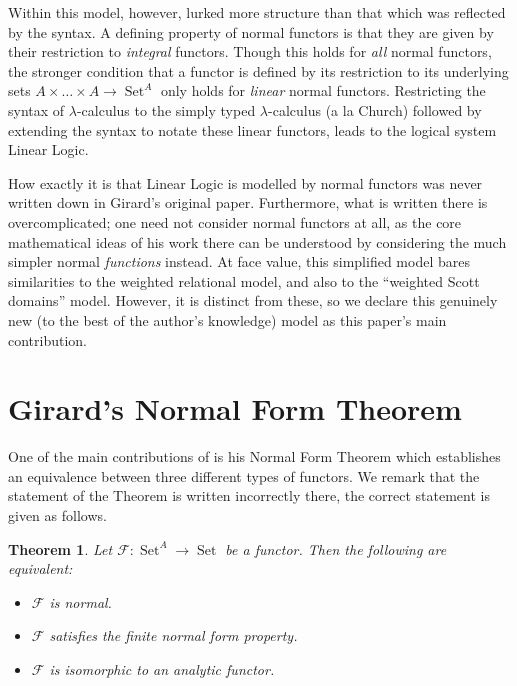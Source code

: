 \documentclass[12pt]{article}
\theoremstyle{plain}
\newtheorem{thm}{Theorem}[subsection] %
\theoremstyle{definition}
\newcommand{\scr}[1]{\mathscr{#1}}
\newcommand{\lto}{\longrightarrow}
\DeclareMathOperator{\set}{Set}
\begin{document}
Within this model, however, lurked more structure than that which was reflected by the syntax. A defining property of normal functors is that they are given by their restriction to \textit{integral} functors. Though this holds for \textit{all} normal functors, the stronger condition that a functor is defined by its restriction to its underlying sets $A \times \ldots \times A \lto \set^A$ only holds for \textit{linear} normal functors. Restricting the syntax of $\lambda$-calculus to the simply typed $\lambda$-calculus (a la Church) followed by extending the syntax to notate these linear functors, leads to the logical system Linear Logic.

How exactly it is that Linear Logic is modelled by normal functors was never written down in Girard's original paper. Furthermore, what is written there is overcomplicated; one need not consider normal functors at all, as the core mathematical ideas of his work there can be understood by considering the much simpler normal \textit{functions} instead. At face value, this simplified model bares similarities to the weighted relational model, and also to the ``weighted Scott domains'' model. However, it is distinct from these, so we declare this genuinely new (to the best of the author's knowledge) model as this paper's main contribution.

\section{Girard's Normal Form Theorem}

One of the main contributions of \cite{Girard} is his Normal Form Theorem \cite[Theorem 2.8]{Girard} which establishes an equivalence between three different types of functors. We remark that the statement of the Theorem is written incorrectly there, the correct statement is given as follows.
 
\begin{thm}\label{thm:normal_form_theorem}
    Let $\scr{F}: \set^A \lto \set$ be a functor. Then the following are equivalent:
    \begin{itemize}
        \item $\scr{F}$ is normal.
        \item $\scr{F}$ satisfies the finite normal form property.
        \item $\scr{F}$ is isomorphic to an analytic functor.
    \end{itemize}
\end{thm}
\end{document}
